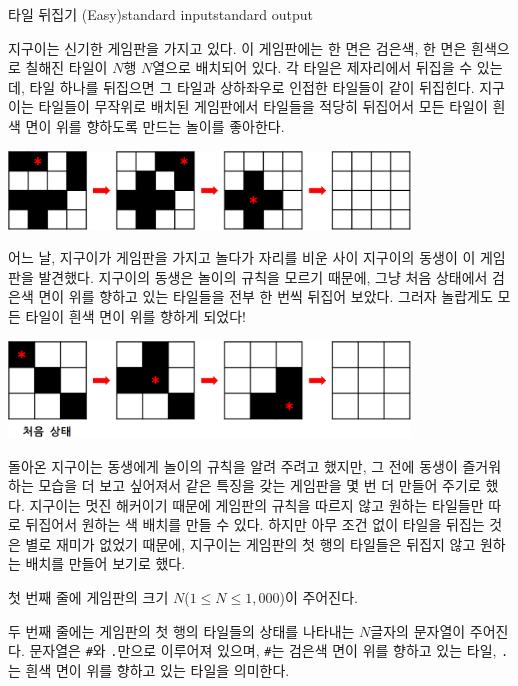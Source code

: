\begin{problem}{타일 뒤집기 (Easy)}{standard input}{standard output}

지구이는 신기한 게임판을 가지고 있다. 이 게임판에는 한 면은 검은색, 한 면은 흰색으로 칠해진 타일이 $N$행 $N$열으로 배치되어 있다. 각 타일은 제자리에서 뒤집을 수 있는데, 타일 하나를 뒤집으면 그 타일과 상하좌우로 인접한 타일들이 같이 뒤집힌다. 지구이는 타일들이 무작위로 배치된 게임판에서 타일들을 적당히 뒤집어서 모든 타일이 흰색 면이 위를 향하도록 만드는 놀이를 좋아한다.

\begin{center}
  \includegraphics[width=0.8\textwidth]{tile1.png}
\end{center}

어느 날, 지구이가 게임판을 가지고 놀다가 자리를 비운 사이 지구이의 동생이 이 게임판을 발견했다. 지구이의 동생은 놀이의 규칙을 모르기 때문에, 그냥 처음 상태에서 검은색 면이 위를 향하고 있는 타일들을 전부 한 번씩 뒤집어 보았다. 그러자 놀랍게도 모든 타일이 흰색 면이 위를 향하게 되었다!

\begin{center}
  \includegraphics[width=0.8\textwidth]{tile2.png}
\end{center}

돌아온 지구이는 동생에게 놀이의 규칙을 알려 주려고 했지만, 그 전에 동생이 즐거워하는 모습을 더 보고 싶어져서 같은 특징을 갖는 게임판을 몇 번 더 만들어 주기로 했다. 지구이는 멋진 해커이기 때문에 게임판의 규칙을 따르지 않고 원하는 타일들만 따로 뒤집어서 원하는 색 배치를 만들 수 있다. 하지만 아무 조건 없이 타일을 뒤집는 것은 별로 재미가 없었기 때문에, 지구이는 게임판의 첫 행의 타일들은 뒤집지 않고 원하는 배치를 만들어 보기로 했다.

\InputFile
첫 번째 줄에 게임판의 크기 $N$($1 \le N \le 1,000$)이 주어진다.

두 번째 줄에는 게임판의 첫 행의 타일들의 상태를 나타내는 $N$글자의 문자열이 주어진다. 문자열은 \texttt{\#}와 \texttt{.}만으로 이루어져 있으며, \texttt{\#}는 검은색 면이 위를 향하고 있는 타일, \texttt{.}는 흰색 면이 위를 향하고 있는 타일을 의미한다.


\end{problem}
